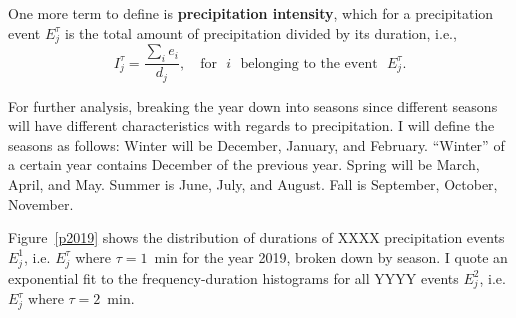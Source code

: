 \documentclass[11pt]{report}
\newcommand{\fracd}[2]{\frac{\displaystyle{#1}}{\displaystyle{#2}}}
\begin{document}
One more term to define is \textbf{precipitation intensity}, which for
a precipitation event $E_j^\tau$ is the total amount of precipitation
divided by its duration, i.e., 
\begin{equation}
I_j^\tau = \fracd{\sum_i e_i }{d_j} ,
\quad
\mbox{for}\,\,\,\, i\,\,\,\, \mbox{belonging to the event}\,\,\,\, E_j^\tau
.
\end{equation}


For further analysis, breaking the year down into seasons since
different seasons will have different characteristics with regards to
precipitation. I will define the seasons as follows: Winter will be
December, January, and February. ``Winter'' of a certain year contains
December of the previous year.  Spring will be March, April, and
May. Summer is June, July, and August. Fall is September, October,
November.

Figure~\ref{p2019} shows the distribution of durations of XXXX
precipitation events $E_j^1$, i.e. $E_j^\tau$ where $\tau=1$~min for
the year 2019, broken down by season. I quote an exponential fit to
the frequency-duration histograms for all YYYY events $E_j^2$,
i.e. $E_j^\tau$ where $\tau=2$~min.
\end{document}
